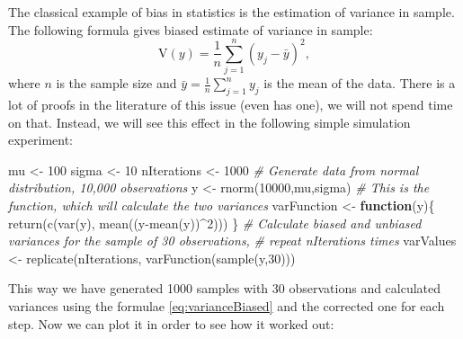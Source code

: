 \documentclass[
]{book}
\newenvironment{Shaded}{\begin{snugshade}}{\end{snugshade}}
\newcommand{\CommentTok}[1]{\textcolor[rgb]{0.56,0.35,0.01}{\textit{#1}}}
\newcommand{\ControlFlowTok}[1]{\textcolor[rgb]{0.13,0.29,0.53}{\textbf{#1}}}
\newcommand{\DecValTok}[1]{\textcolor[rgb]{0.00,0.00,0.81}{#1}}
\newcommand{\FunctionTok}[1]{\textcolor[rgb]{0.00,0.00,0.00}{#1}}
\newcommand{\NormalTok}[1]{#1}
\newcommand{\OtherTok}[1]{\textcolor[rgb]{0.56,0.35,0.01}{#1}}
\newcommand{\SpecialCharTok}[1]{\textcolor[rgb]{0.00,0.00,0.00}{#1}}
\theoremstyle{definition}
\theoremstyle{definition}
\theoremstyle{definition}
\theoremstyle{definition}
\theoremstyle{remark}
\begin{document}
The classical example of bias in statistics is the estimation of variance in sample. The following formula gives biased estimate of variance in sample:
\begin{equation}
    \mathrm{V}(y) = \frac{1}{n} \sum_{j=1}^n \left( y_j - \bar{y} \right)^2,
    \label{eq:varianceBiased}
\end{equation}
where \(n\) is the sample size and \(\bar{y} = \frac{1}{n} \sum_{j=1}^n y_j\) is the mean of the data. There is a lot of proofs in the literature of this issue (even \citet{WikipediaVarianceBias2020} has one), we will not spend time on that. Instead, we will see this effect in the following simple simulation experiment:

\begin{Shaded}
\begin{Highlighting}[]
\NormalTok{mu }\OtherTok{\textless{}{-}} \DecValTok{100}
\NormalTok{sigma }\OtherTok{\textless{}{-}} \DecValTok{10}
\NormalTok{nIterations }\OtherTok{\textless{}{-}} \DecValTok{1000}
\CommentTok{\# Generate data from normal distribution, 10,000 observations}
\NormalTok{y }\OtherTok{\textless{}{-}} \FunctionTok{rnorm}\NormalTok{(}\DecValTok{10000}\NormalTok{,mu,sigma)}
\CommentTok{\# This is the function, which will calculate the two variances}
\NormalTok{varFunction }\OtherTok{\textless{}{-}} \ControlFlowTok{function}\NormalTok{(y)\{}
   \FunctionTok{return}\NormalTok{(}\FunctionTok{c}\NormalTok{(}\FunctionTok{var}\NormalTok{(y), }\FunctionTok{mean}\NormalTok{((y}\SpecialCharTok{{-}}\FunctionTok{mean}\NormalTok{(y))}\SpecialCharTok{\^{}}\DecValTok{2}\NormalTok{)))}
\NormalTok{\}}
\CommentTok{\# Calculate biased and unbiased variances for the sample of 30 observations,}
\CommentTok{\# repeat nIterations times}
\NormalTok{varValues }\OtherTok{\textless{}{-}} \FunctionTok{replicate}\NormalTok{(nIterations, }\FunctionTok{varFunction}\NormalTok{(}\FunctionTok{sample}\NormalTok{(y,}\DecValTok{30}\NormalTok{)))}
\end{Highlighting}
\end{Shaded}

This way we have generated 1000 samples with 30 observations and calculated variances using the formulae \eqref{eq:varianceBiased} and the corrected one for each step. Now we can plot it in order to see how it worked out:
\end{document}
